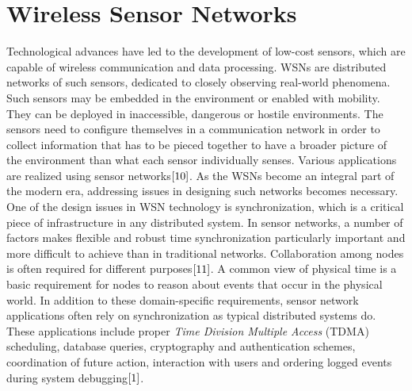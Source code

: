 \documentclass[a4paper,10pt]{report}
\begin{document}
\section{\textbf{Wireless Sensor Networks}}
Technological advances have led to the development of low-cost sensors, which are capable of wireless communication and
data processing. WSNs are distributed networks of such sensors, dedicated to closely observing
real-world phenomena. Such sensors may be embedded in the environment or enabled with mobility. They can be deployed in
inaccessible, dangerous or hostile environments. The sensors need to configure themselves in a communication network in order to collect
information that has to be pieced together to have a broader picture of the environment than what each sensor individually
senses. Various applications are realized using sensor networks$\cite{10}$. As the WSNs become an integral part of the modern era, addressing issues in designing such networks becomes necessary.
\newline One of the design issues in WSN technology is synchronization, which is a critical piece of infrastructure in any
distributed system. In sensor networks, a number of factors makes flexible and robust time synchronization particularly important and
more difficult to achieve than in traditional networks.
\newline
Collaboration among nodes is often required for different purposes$\cite{11}$. A common view of physical time is a basic
requirement for nodes to reason about events that occur in the physical world. In addition to these domain-specific requirements,
sensor network applications often rely on synchronization as typical distributed systems do. These applications include proper \textit{Time Division Multiple Access} (TDMA) scheduling, database queries, cryptography and authentication schemes, coordination of future action, interaction with users and ordering logged events during system debugging$\cite{1}$.
\end{document}
